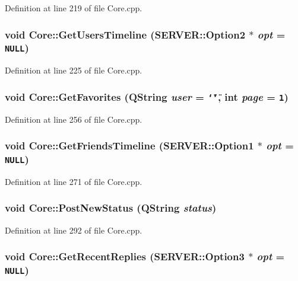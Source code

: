 Definition at line 219 of file Core.cpp.\hypertarget{classCore_7308eb02f04bd6da071db62f291c9def}{
\subsubsection{\setlength{\rightskip}{0pt plus 5cm}void Core::GetUsersTimeline ({\bf SERVER::Option2} $\ast$ {\em opt} = {\tt NULL})}}
\label{classCore_7308eb02f04bd6da071db62f291c9def}




Definition at line 225 of file Core.cpp.\hypertarget{classCore_a896aea28b564e4841df4cf527fb0247}{
\subsubsection{\setlength{\rightskip}{0pt plus 5cm}void Core::GetFavorites (QString {\em user} = {\tt \char`\"{}\char`\"{}}, \/  int {\em page} = {\tt 1})}}
\label{classCore_a896aea28b564e4841df4cf527fb0247}




Definition at line 256 of file Core.cpp.\hypertarget{classCore_bc64aa3de63d39a878db543d8d5df9f5}{
\subsubsection{\setlength{\rightskip}{0pt plus 5cm}void Core::GetFriendsTimeline ({\bf SERVER::Option1} $\ast$ {\em opt} = {\tt NULL})}}
\label{classCore_bc64aa3de63d39a878db543d8d5df9f5}




Definition at line 271 of file Core.cpp.\hypertarget{classCore_7023af805b629e90a7aa2978366ee344}{
\subsubsection{\setlength{\rightskip}{0pt plus 5cm}void Core::PostNewStatus (QString {\em status})}}
\label{classCore_7023af805b629e90a7aa2978366ee344}




Definition at line 292 of file Core.cpp.\hypertarget{classCore_b95dc3fca63c84496f6a487d845e7ba9}{
\subsubsection{\setlength{\rightskip}{0pt plus 5cm}void Core::GetRecentReplies ({\bf SERVER::Option3} $\ast$ {\em opt} = {\tt NULL})}}
\label{classCore_b95dc3fca63c84496f6a487d845e7ba9}




